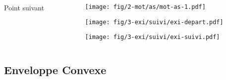 \begin{frame}
\begin{columns}[t]
\begin{column}{0.6\linewidth}
{\begin{block}{Point suivant}
\begin{itemize}
        \end{itemize}
      \end{block} 
    }
  \end{column}
  \begin{column}{0.4\linewidth}
    {
      \begin{figure}[h!]
        \centering
        \texttt{[image: fig/2-mot/as/mot-as-1.pdf]}
      \end{figure}    
    }
    {
      \begin{figure}[h!]
        \centering
        \texttt{[image: fig/3-exi/suivi/exi-depart.pdf]}
      \end{figure}    
    }
    {  
      \begin{figure}[h!]
        \centering
        \texttt{[image: fig/3-exi/suivi/exi-suivi.pdf]}
      \end{figure}  
    }
  \end{column}
\end{columns}





\end{frame}

\subsection{Enveloppe Convexe}

